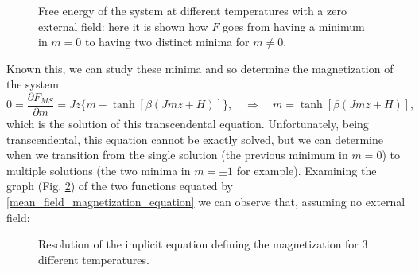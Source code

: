 \begin{figure}[h]
    \centering
    \label{Fig:free energy}
    \caption{Free energy of the system at different temperatures with a zero external field: here it is shown how $F$ goes from having a minimum in $m=0$ to having two distinct minima for $m\neq0$.}
\end{figure}
Known this, we can study these minima and so determine the magnetization of the system
\begin{equation}
    0=\frac{\partial F_{MS}}{\partial m}=Jz\{m-\tanh[\beta(Jmz+H)]\}, \quad \Rightarrow\quad m=\tanh[\beta(Jmz+H)],\label{mean_field_magnetization_equation}
\end{equation}
which is the solution of this transcendental equation. Unfortunately, being transcendental, this equation cannot be exactly solved, but we can determine when we transition from the single solution (the previous minimum in $m=0$) to multiple solutions (the two minima in $m=\pm1$ for example). Examining the graph (Fig. \ref{Fig:Soluzione m}) of the two functions equated by \eqref{mean_field_magnetization_equation} we can observe that, assuming no external field:
\begin{figure}[h]
    \centering
    \label{Fig:Soluzione m}
    \caption{Resolution of the implicit equation defining the magnetization for 3 different temperatures.}
\end{figure}
